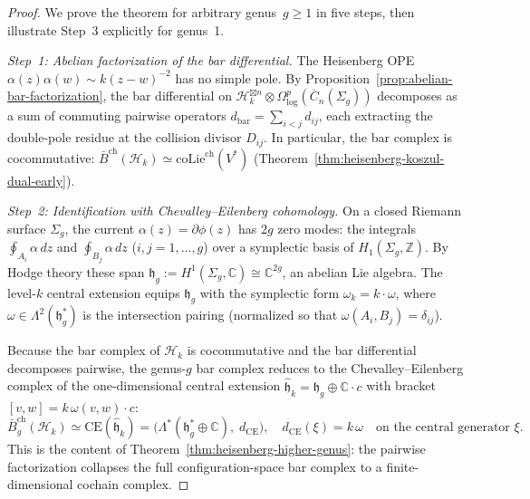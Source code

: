 \begin{proof}
We prove the theorem for arbitrary genus~$g \geq 1$ in five steps,
then illustrate Step~3 explicitly for genus~1.

\emph{Step~1: Abelian factorization of the bar differential.}
The Heisenberg OPE $\alpha(z)\alpha(w) \sim k(z-w)^{-2}$ has no
simple pole.  By
Proposition~\ref{prop:abelian-bar-factorization}, the bar differential
on $\mathcal{H}_k^{\boxtimes n} \otimes
\Omega^p_{\log}(\overline{C}_n(\Sigma_g))$ decomposes as a sum of
commuting pairwise operators $d_{\mathrm{bar}} = \sum_{i<j} d_{ij}$,
each extracting the double-pole residue at the collision divisor
$D_{ij}$.  In particular, the bar complex is cocommutative:
$\bar{B}^{\mathrm{ch}}(\mathcal{H}_k)
\simeq \mathrm{coLie}^{\mathrm{ch}}(V^*)$
(Theorem~\ref{thm:heisenberg-koszul-dual-early}).

\emph{Step~2: Identification with Chevalley--Eilenberg cohomology.}
On a closed Riemann surface $\Sigma_g$, the current
$\alpha(z) = \partial\phi(z)$ has $2g$ zero modes: the
integrals $\oint_{A_i} \alpha\, dz$ and $\oint_{B_j} \alpha\, dz$
($i,j = 1, \ldots, g$) over a symplectic basis of
$H_1(\Sigma_g, \mathbb{Z})$.  By Hodge theory these span
$\mathfrak{h}_g := H^1(\Sigma_g, \mathbb{C}) \cong \mathbb{C}^{2g}$,
an abelian Lie algebra.  The level-$k$ central extension equips
$\mathfrak{h}_g$ with the symplectic form
$\omega_k = k \cdot \omega$, where
$\omega \in \Lambda^2(\mathfrak{h}_g^*)$ is the intersection pairing
(normalized so that $\omega(A_i, B_j) = \delta_{ij}$).

Because the bar complex of $\mathcal{H}_k$ is cocommutative and
the bar differential decomposes pairwise, the genus-$g$ bar complex
reduces to the Chevalley--Eilenberg complex of the one-dimensional
central extension $\hat{\mathfrak{h}}_k = \mathfrak{h}_g \oplus
\mathbb{C} \cdot c$ with bracket $[v,w] = k\,\omega(v,w)\cdot c$:
\[
\bar{B}^{\mathrm{ch}}_g(\mathcal{H}_k)
\simeq \mathrm{CE}(\hat{\mathfrak{h}}_k)
= \bigl(\Lambda^*(\mathfrak{h}_g^* \oplus \mathbb{C}),\;
  d_{\mathrm{CE}}\bigr),
\quad
d_{\mathrm{CE}}(\xi) = k\,\omega \quad
\text{on the central generator }\xi.
\]
This is the content of
Theorem~\ref{thm:heisenberg-higher-genus}: the pairwise
factorization collapses the full configuration-space bar complex to
a finite-dimensional cochain complex.


\end{proof}

